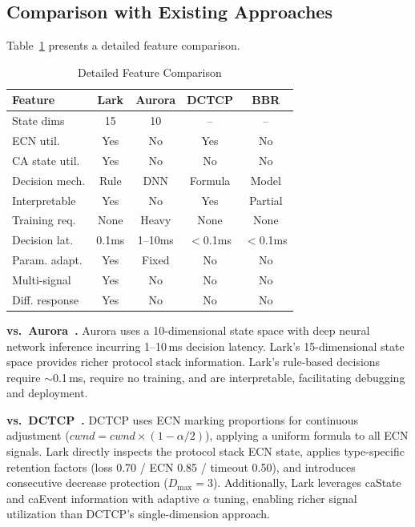 \documentclass[10pt,twocolumn]{article}
\begin{document}
\subsection{Comparison with Existing Approaches}

Table~\ref{tab:comparison} presents a detailed feature comparison.

\begin{table}[htbp]
\centering
\caption{Detailed Feature Comparison}
\label{tab:comparison}
\small
\begin{tabular}{lcccc}
\toprule
\textbf{Feature} & \textbf{Lark} & \textbf{Aurora} & \textbf{DCTCP} & \textbf{BBR} \\
\midrule
State dims & 15 & 10 & -- & -- \\
ECN util. & Yes & No & Yes & No \\
CA state util. & Yes & No & No & No \\
Decision mech. & Rule & DNN & Formula & Model \\
Interpretable & Yes & No & Yes & Partial \\
Training req. & None & Heavy & None & None \\
Decision lat. & 0.1ms & 1--10ms & $<$0.1ms & $<$0.1ms \\
Param. adapt. & Yes & Fixed & No & No \\
Multi-signal & Yes & No & No & No \\
Diff. response & Yes & No & No & No \\
\bottomrule
\end{tabular}
\end{table}

\textbf{vs.\ Aurora~\cite{aurora}.} Aurora uses a 10-dimensional state space with deep neural network inference incurring 1--10\,ms decision latency. Lark's 15-dimensional state space provides richer protocol stack information. Lark's rule-based decisions require $\sim$0.1\,ms, require no training, and are interpretable, facilitating debugging and deployment.

\textbf{vs.\ DCTCP~\cite{dctcp}.} DCTCP uses ECN marking proportions for continuous adjustment ($cwnd = cwnd \times (1 - \alpha/2)$), applying a uniform formula to all ECN signals. Lark directly inspects the protocol stack ECN state, applies type-specific retention factors (loss 0.70 / ECN 0.85 / timeout 0.50), and introduces consecutive decrease protection ($D_{\max}=3$). Additionally, Lark leverages caState and caEvent information with adaptive $\alpha$ tuning, enabling richer signal utilization than DCTCP's single-dimension approach.
\end{document}
